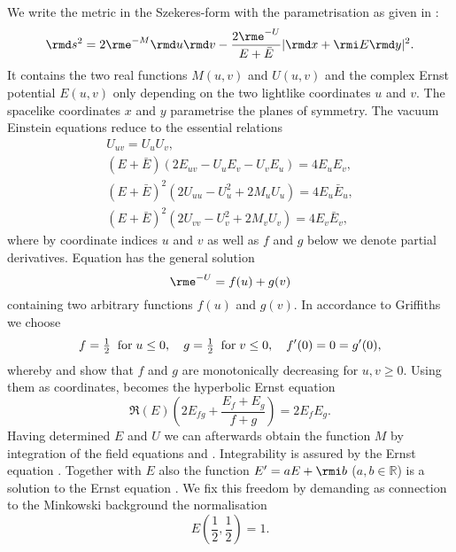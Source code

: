 \documentclass[12pt]{iopart}
\begin{document}
We write the metric in the Szekeres-form \cite{Szekeres1972} with the parametrisation as given in \cite{Griffiths1991} :
\begin{equation}  
 \rmd s^2=2\rme^{-M}\rmd u\rmd v-\frac{2\rme^{-U}}{E+\bar{E}}\vert \rmd x+\rmi E\rmd y\vert^2. \label{metric}
\end{equation}
It contains the two real functions $M(u,v)$ and $U(u,v)$ and the complex Ernst potential $E(u,v)$ only depending on the two lightlike coordinates $u$ and $v$. The spacelike coordinates $x$ and $y$ parametrise the planes of symmetry.
The vacuum Einstein equations reduce to the essential relations 
\begin{eqnarray}
U_{uv}=U_{u}U_{v}, \label{Uuv}\\
(E+\bar{E})(2E_{uv}-U_u E_v-U_v E_u)=4 E_u E_v, \label{Euv} \\
(E+\bar{E})^2(2U_{uu}-U_u^2+2M_u U_u)=4 E_u \bar{E}_u , \label{Mu}\\
(E+\bar{E})^2(2U_{vv}-U_v^2+2M_v U_v)=4 E_v \bar{E}_v,  \label{Mv}
\end{eqnarray} 
where by coordinate indices $u$ and $v$ as well as $f$ and $g$ below we denote partial derivatives. Equation  has the general solution
\begin{equation} 
\rme^{-U}=f(u)+g(v)
\end{equation}
containing two arbitrary functions $f(u)$ and $g(v)$. In accordance to Griffiths \cite{Griffiths1991} we choose
\begin{eqnarray}
f=\mbox{$\frac12$} \;\;{\rm for}\; u\leq 0,\quad g=\mbox{$\frac12$} \;\;{\rm for}\; v\leq 0, \quad f'(0)=0=g'(0), \label{fgStart}
\end{eqnarray}
whereby  and  show that $f$ and $g$ are monotonically decreasing for $u,v\geq 0$. Using them as coordinates,  becomes the hyperbolic Ernst equation
\begin{equation} \label{ErnstGl}
\Re(E)\left(2E_{fg}+\frac{E_f+E_g}{f+g}\right)=2 E_f E_g.
\end{equation}
Having determined $E$ and $U$ we can afterwards obtain the function $M$ by integration of the field equations  and . Integrability is assured by the Ernst equation . Together with $E$ also the function $E'=aE+\rmi b$ ($a,b\in\mathbb{R}$) is a solution to the Ernst equation . We fix this freedom by demanding as connection to the Minkowski background the normalisation
\begin{equation}
E(\mbox{$\frac12$},\mbox{$\frac12$})=1. \label{NormErnst}
\end{equation}
\end{document}

